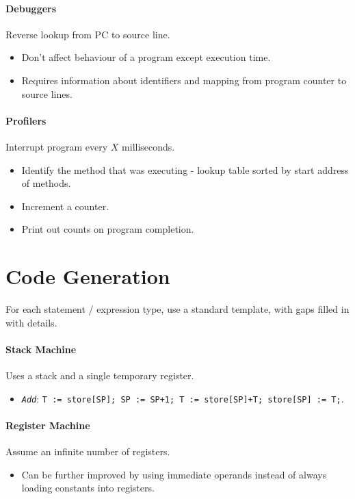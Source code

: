\documentclass[twocolumn,english]{article}
\begin{document}
\paragraph{Debuggers}

Reverse lookup from PC to source line.
\begin{itemize}
\item Don't affect behaviour of a program except execution time.
\item Requires information about identifiers and mapping from program counter
to source lines.
\end{itemize}

\paragraph{Profilers}

Interrupt program every $X$ milliseconds.
\begin{itemize}
\item Identify the method that was executing - lookup table sorted by start
address of methods.
\item Increment a counter.
\item Print out counts on program completion.
\end{itemize}

\section{Code Generation}

For each statement / expression type, use a standard template, with
gaps filled in with details.

\paragraph{Stack Machine}

Uses a stack and a single temporary register.
\begin{itemize}
\item \texttt{\emph{Add}}: \texttt{T := store{[}SP{]}; SP := SP+1; T :=
store{[}SP{]}+T; store{[}SP{]} := T;}.
\end{itemize}

\paragraph{Register Machine}

Assume an infinite number of registers.
\begin{itemize}
\item Can be further improved by using immediate operands instead of always
loading constants into registers.
\end{itemize}
\end{document}
